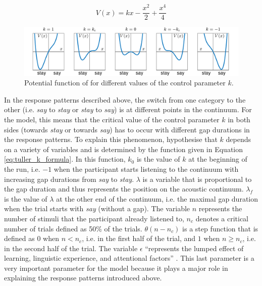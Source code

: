 \begin{equation}
V(x) = kx - \frac{x^2}{2} + \frac{x^4}{4}
\label{eq:tuller_potential_equation}
\end{equation}

\begin{figure}
\includegraphics[width=\textwidth]{figures/ch3/tuller_potential.pdf}
\caption{Potential function of \citet{Tulleretal1994} for different values of the control parameter $k$.}
\label{fig:tuller_potential}
\end{figure}

In the response patterns described above, the switch from one category to the other (i.e. \emph{say} to \emph{stay} or \emph{stay} to \emph{say}) is at different points in the continuum. For the model, this means that the critical value of the control parameter $k$ in both sides (towards \emph{stay} or towards \emph{say}) has to occur with different gap durations in the response patterns. To explain this phenomenon, \citet{Tulleretal1994} hypothesise that $k$ depends on a variety of variables and is determined by the function given in Equation \ref{eq:tuller_k_formula}. In this function, $k_0$ is the value of $k$ at the beginning of the run, i.e. $-1$ when the participant starts listening to the continuum with increasing gap durations from \emph{say} to \emph{stay}. $\lambda$ is a variable that is proportional to the gap duration and thus represents the position on the acoustic continuum. $\lambda_f$ is the value of $\lambda$ at the other end of the continuum, i.e. the maximal gap duration when the trial starts with \emph{say} (without a gap). The variable $n$ represents the number of stimuli that the participant already listened to, $n_c$ denotes a critical number of trials defined as 50\% of the trials. $\theta(n-n_c)$ is a step function that is defined as $0$ when $n < n_c$, i.e. in the first half of the trial, and $1$ when $n \geq n_c$, i.e. in the second half of the trial. The variable $\epsilon$ ``represents the lumped effect of learning, linguistic experience, and attentional factors” \citep[8]{Tulleretal1994}. This last parameter is a very important parameter for the model because it plays a major role in explaining the response patterns introduced above.

